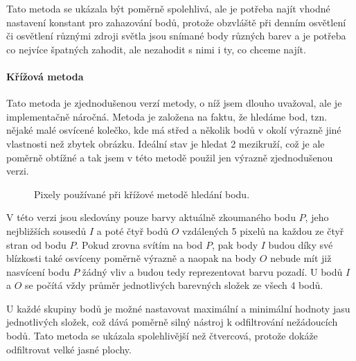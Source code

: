 \documentclass[twoside,12pt]{article}
\newcommand{\podpodsekce}[1]{\paragraph{#1}\quad\vskip 6pt}
\begin{document}
Tato metoda se ukázala být poměrně spolehlivá, ale je potřeba najít vhodné nastavení konstant pro zahazování bodů, protože obzvláště při denním osvětlení či osvětlení různými zdroji světla  jsou snímané body různých barev a je potřeba co nejvíce špatných zahodit, ale nezahodit s nimi i ty, co chceme najít.

\podpodsekce{Křížová metoda}

Tato metoda je zjednodušenou verzí metody, o níž jsem dlouho uvažoval, ale je implementačně náročná. Metoda je založena na faktu, že hledáme bod, tzn. nějaké malé osvícené kolečko, kde má střed a několik bodů v okolí výrazně jiné vlastnosti než zbytek obrázku. Ideální stav je hledat 2 mezikruží, což je ale poměrně obtížné a tak jsem v této metodě použil jen výrazně zjednodušenou verzi.

\begin{figure}[ht]
 \begin{center}
 \end{center}
 \caption{Pixely používané při křížové metodě hledání bodu.}
\end{figure}

V této verzi jsou sledovány pouze barvy aktuálně zkoumaného bodu $P$, jeho nejbližších sousedů $I$ a poté čtyř bodů $O$ vzdálených 5 pixelů na každou ze čtyř stran od bodu $P$. Pokud zrovna svítím na bod $P$, pak body $I$ budou díky své blízkosti také osvíceny poměrně výrazně a naopak na body $O$ nebude mít již nasvícení bodu $P$ žádný vliv a budou tedy reprezentovat barvu pozadí. U bodů $I$ a $O$ se počítá vždy průměr jednotlivých barevných složek ze všech 4 bodů. 

U každé skupiny bodů je možné nastavovat maximální a minimální hodnoty jasu jednotlivých složek, což dává poměrně silný nástroj k odfiltrování nežádoucích bodů. Tato metoda se ukázala spolehlivější než čtvercová, protože dokáže odfiltrovat velké jasné plochy.
\end{document}
